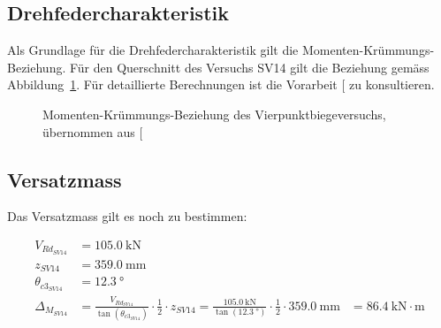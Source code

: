 \documentclass[
  10pt,
  letterpaper,
]{scrreprt}
\begin{document}
\subsection{Drehfedercharakteristik}\label{drehfedercharakteristik-1}

Als Grundlage für die Drehfedercharakteristik gilt die
Momenten-Krümmungs-Beziehung. Für den Querschnitt des Versuchs SV14 gilt
die Beziehung gemäss Abbildung~\ref{fig-mchi_sv14}. Für detaillierte
Berechnungen ist die Vorarbeit {[}\citeproc{ref-gitz_ansatze_2024}{1}{]}
zu konsultieren.

\begin{figure}[H]


\caption{\label{fig-mchi_sv14}Momenten-Krümmungs-Beziehung des
Vierpunktbiegeversuchs, übernommen aus
{[}\citeproc{ref-gitz_ansatze_2024}{1}{]}}

\end{figure}%

\subsection{Versatzmass}\label{versatzmass-1}

Das Versatzmass gilt es noch zu bestimmen:

$$
\begin{aligned}
V_{Rd_{SV14}} &= 105.0\ \mathrm{kN} \; 
\\[12pt]
z_{SV14} &= 359.0\ \mathrm{mm} \; 
\\[12pt]
\theta_{c3_{SV14}} &= 12.3\ \mathrm{°} \; 
\\[12pt]
\Delta_{M_{SV14}} &= \frac{ V_{Rd_{SV14}} }{ \tan \left( \theta_{c3_{SV14}} \right) } \cdot \frac{1} { 2 } \cdot z_{SV14}  = \frac{ 105.0\ \mathrm{kN} }{ \tan \left( 12.3\ \mathrm{°} \right) } \cdot \frac{1} { 2 } \cdot 359.0\ \mathrm{mm} &= 86.4\ \mathrm{kN} \cdot \mathrm{m}  
\end{aligned}
$$
\end{document}
